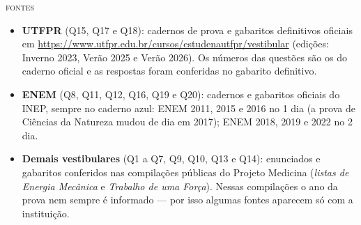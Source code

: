 \documentclass[11pt,a4paper]{article}
\begin{document}
\begin{painel}
{\small\scshape\color{grafite}fontes}\par\smallskip
\small
\begin{itemize}[nosep, leftmargin=1.5em]
  \item \textbf{UTFPR} (Q15, Q17 e Q18): cadernos de prova e gabaritos
        definitivos oficiais em
        \url{https://www.utfpr.edu.br/cursos/estudenautfpr/vestibular}
        (edi\c{c}\~oes: Inverno 2023, Ver\~ao 2025 e Ver\~ao 2026). Os
        n\'umeros das quest\~oes s\~ao os do caderno oficial e as
        respostas foram conferidas no gabarito definitivo.
  \item \textbf{ENEM} (Q8, Q11, Q12, Q16, Q19 e Q20): cadernos e
        gabaritos oficiais do INEP, sempre no caderno azul: ENEM 2011,
        2015 e 2016 no 1\textordmasculine{} dia (a prova de
        Ci\^encias da Natureza mudou de dia em 2017); ENEM 2018,
        2019 e 2022 no 2\textordmasculine{} dia.
  \item \textbf{Demais vestibulares} (Q1 a Q7, Q9, Q10, Q13 e Q14):
        enunciados e gabaritos conferidos nas compila\c{c}\~oes
        p\'ublicas do Projeto Medicina (\textit{listas de Energia
        Mec\^anica} e \textit{Trabalho de uma For\c{c}a}). Nessas
        compila\c{c}\~oes o ano da prova nem sempre \'e informado ---
        por isso algumas fontes aparecem s\'o com a
        institui\c{c}\~ao.

\end{itemize}
\end{painel}

\end{document}
